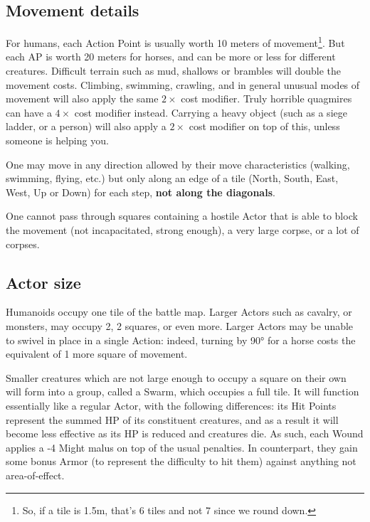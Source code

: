 \subsection{Movement details}

For humans, each Action Point is usually worth 10 meters of movement\footnote{So, if a tile is 1.5m, that's 6 tiles and not 7 since we round down.}. But each AP is worth 20 meters for horses, and can be more or less for different creatures. Difficult terrain such as mud, shallows or brambles will double the movement costs. Climbing, swimming, crawling, and in general unusual modes of movement will also apply the same $2\times$ cost modifier. Truly horrible quagmires can have a $4\times$ cost modifier instead. Carrying a heavy object (such as a siege ladder, or a person) will also apply a $2\times$ cost modifier on top of this, unless someone is helping you. 

One may move in any direction allowed by their move characteristics (walking, swimming, flying, etc.) but only along an edge of a tile (North, South, East, West, Up or Down) for each step, \textbf{not along the diagonals}.

One cannot pass through squares containing a hostile Actor that is able to block the movement (not incapacitated, strong enough), a very large corpse, or a lot of corpses. 


\subsection{Actor size}

\label{actor_size}

Humanoids occupy one tile of the battle map. Larger Actors such as cavalry, or monsters, may occupy 2, 2 squares, or even more. Larger Actors may be unable to swivel in place in a single Action: indeed, turning by 90° for a horse costs the equivalent of 1 more square of movement.

Smaller creatures which are not large enough to occupy a square on their own will form into a group, called a Swarm, which occupies a full tile. It will function essentially like a regular Actor, with the following differences: its Hit Points represent the summed HP of its constituent creatures, and as a result it will become less effective as its HP is reduced and creatures die. As such, each Wound applies a -4 Might malus on top of the usual penalties. In counterpart, they gain some bonus Armor (to represent the difficulty to hit them) against anything not area-of-effect.

